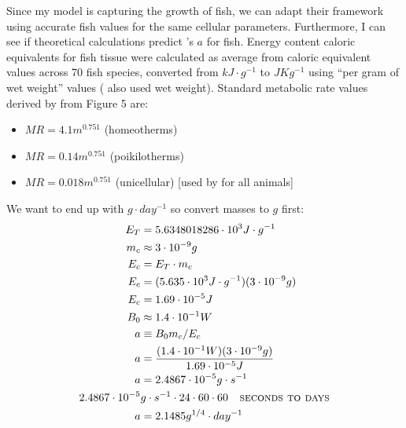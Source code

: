 \documentclass[a4paper]{article} %
\begin{document}
Since my model is capturing the growth of fish, we can adapt their framework using  accurate fish values for the same cellular parameters. Furthermore, I can see if theoretical calculations predict \cite{West2001}'s $a$ for fish. Energy content caloric equivalents for fish tissue were calculated as average from caloric equivalent values across 70 fish species, converted from $kJ\cdot g^{-1}$ to $JKg^{-1}$ using ``per gram of wet weight'' values \autocite{Steimle1980} (\cite{West2001} also used wet weight). Standard metabolic rate values derived by \cite{Hemmingsen1960} from Figure 5 are:
\begin{itemize}
    \item $MR = 4.1m^{0.751}$ (homeotherms)
    \item $MR = 0.14m^{0.751}$ (poikilotherms)
    \item $MR = 0.018m^{0.751}$ (unicellular) [used by \cite{West2001} for all animals]
\end{itemize}

We want to end up with $g\cdot day^{-1}$ so convert masses to $g$ first:
\begin{align*}
    E_T &= 5.6348018286 \cdot 10^3 J\cdot g^{-1} \\
    m_c &\approx 3 \cdot 10^{-9} g \\
    E_c &= E_T \cdot m_c \\
    E_c &= (5.635 \cdot 10^3 J\cdot g^{-1})(3 \cdot 10^{-9} g) \\
    E_c &= 1.69 \cdot 10^{-5} J \\
    B_0 &\approx 1.4 \cdot 10^{-1} W \\
    a &\equiv B_{0}m_{c}/E_{c} \\
    a &= \frac{(1.4 \cdot 10^{-1} W)(3 \cdot 10^{-9} g)}{1.69 \cdot 10^{-5} J}\\
    a &= 2.4867 \cdot 10^{-5}g\cdot s^{-1} \\
    2.4867 \cdot 10^{-5}&g\cdot s^{-1} \cdot 24 \cdot 60 \cdot 60 \ \ \textsc{   seconds to days}\\
    a &= 2.1485 g^{1/4}\cdot day^{-1}
\end{align*}

\end{document}
